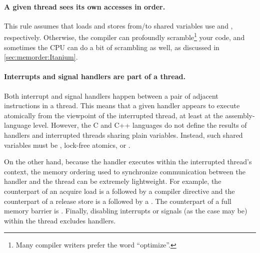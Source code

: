 \QuickQuizEnd

\paragraph{A given thread sees its own accesses in order.}
This rule assumes that loads and stores from/to shared variables use
 and , respectively.
Otherwise, the compiler can profoundly scramble\footnote{
	Many compiler writers prefer the word ``optimize''.}
your code, and sometimes the CPU can do a bit of scrambling as well,
as discussed in \cref{sec:memorder:Itanium}.

\paragraph{Interrupts and signal handlers are part of a thread.}
Both interrupt and signal handlers happen between a pair of adjacent
instructions in a thread.
This means that a given handler appears to execute atomically
from the viewpoint of the interrupted thread, at least at the
assembly-language level.
However, the C and C++ languages do not define the results of handlers
and interrupted threads sharing plain variables.
Instead, such shared variables must be , lock-free
atomics, or .

On the other hand, because the handler executes within the interrupted
thread's context, the memory ordering used to synchronize communication
between the handler and the thread can be extremely lightweight.
For example, the counterpart of an acquire load is a 
followed by a  compiler directive and the counterpart
of a release store is a  followed by a .
The counterpart of a full memory barrier is .
Finally, disabling interrupts or signals (as the case may be) within
the thread excludes handlers.


